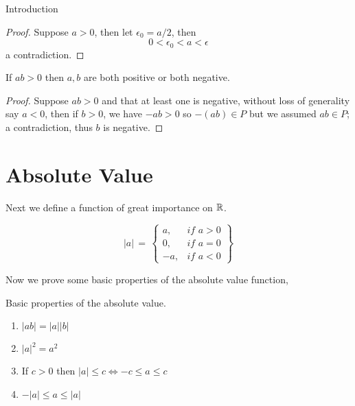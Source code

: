 \begin{chapter}{Introduction}
    
    \begin{proof}
        Suppose $a > 0$, then let $\epsilon_0 = a/2$, then 
        \[0 < \epsilon_0 < a < \epsilon\]
        a contradiction.
    \end{proof}

    
    \begin{thm}
        If $ab > 0$ then $a, b$ are both positive or both negative. 

    \end{thm}

    
    \begin{proof}
        Suppose $ab > 0$ and that at least one is negative, without loss of generality say $a < 0$, then if $b > 0$, we have 
        $-ab > 0$ so $-(ab) \in P$ but we assumed $ab \in P$; a contradiction, thus $b$ is negative. 
    \end{proof}

    \section{Absolute Value}
    Next we define a function of great importance on $\mathbb{R}$. 

    
    \begin{equation}
        |a| \, = \, 
        \left\{
        \begin{array}{lr}
             a, & \textit{if }  a > 0 \\ 
             0, & \textit{if } a = 0 \\ 
            -a, & \textit{if } a < 0 
        \end{array}
        \right\}
    \end{equation}

    Now we prove some basic properties of the absolute value function, 

    
    \begin{thm}
        Basic properties of the absolute value. 
        \begin{enumerate}
            \item $|ab| = |a||b|$
            \item $|a|^2 = a^2 $
            \item If $c  > 0$ then $|a| \leq c \Leftrightarrow -c \leq a \leq c$
            \item $-|a| \leq a \leq |a|$
        \end{enumerate}
    \end{thm}


\end{chapter}
